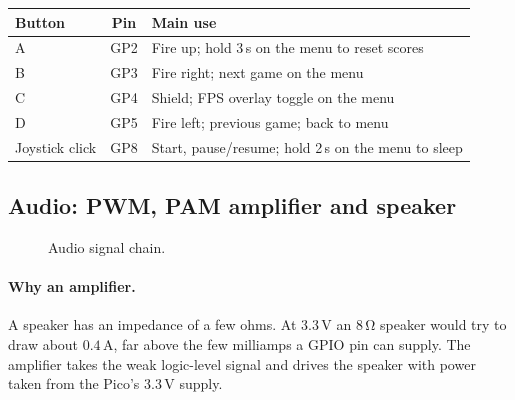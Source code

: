 \documentclass[11pt,a4paper]{article}
\newcommand{\unit}[2]{\ensuremath{#1\,\mathrm{#2}}}
\begin{document}
\begin{center}
\begin{tabular}{lcl}
\toprule
\textbf{Button} & \textbf{Pin} & \textbf{Main use} \\
\midrule
A & GP2 & Fire up; hold 3\,s on the menu to reset scores \\
B & GP3 & Fire right; next game on the menu \\
C & GP4 & Shield; FPS overlay toggle on the menu \\
D & GP5 & Fire left; previous game; back to menu \\
Joystick click & GP8 & Start, pause/resume; hold 2\,s on the menu to sleep \\
\bottomrule
\end{tabular}
\end{center}

\subsection{Audio: PWM, PAM amplifier and speaker}\label{sec:audiohw}
\begin{figure}[H]
\centering
{}
\caption{Audio signal chain.}
\end{figure}

\paragraph{Why an amplifier.} A speaker has an impedance of a few ohms. At
3.3\,V an \unit{8}{\Omega} speaker would try to draw about \unit{0.4}{A}, far
above the few milliamps a GPIO pin can supply. The amplifier takes the weak
logic-level signal and drives the speaker with power taken from the Pico's 3.3\,V supply.
\end{document}
